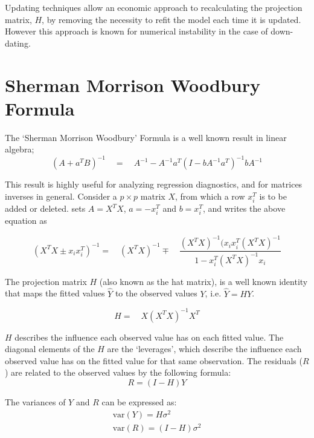 \documentclass[12pt, a4paper]{article}
\begin{document}
Updating techniques allow an economic approach to recalculating
the projection matrix, $H$, by removing the necessity to refit the
model each time it is updated. However this approach is known for
numerical instability in the case of down-dating.

\section{Sherman Morrison Woodbury Formula} %

The `Sherman Morrison Woodbury' Formula is a well known result in
linear algebra;
\begin{equation}
(A+a^{T}B)^{-1} \quad = \quad A^{-1}-
A^{-1}a^{T}(I-bA^{-1}a^{T})^{-1}bA^{-1}
\end{equation}

This result is highly useful for analyzing regression diagnostics,
and for matrices inverses in general. Consider a $p \times p$
matrix $X$, from which a row $x_{i}^{T}$ is to be added or
deleted. \citet{CookWeisberg} sets $A = X^{T}X$, $a=-x_{i}^{T}$
and $b=x_{i}^{T}$, and writes the above equation as

\begin{equation}
(X^{T}X \pm x_{i}x_{i}^{T})^{-1} = \quad(X^{T}X )^{-1} \mp \quad
\frac{(X^{T}X)^{-1}(x_{i}x_{i}^{T}(X^{T}X)^{-1}}{1-x_{i}^{T}(X^{T}X)^{-1}x_{i}}
\end{equation}

The projection matrix $H$ (also known as the hat matrix), is a
well known identity that maps the fitted values $\hat{Y}$ to the
observed values $Y$, i.e. $\hat{Y} = HY$.

\begin{equation}
H =\quad X(X^{T}X)^{-1}X^{T}
\end{equation}

$H$ describes the influence each observed value has on each fitted value. The diagonal elements of the $H$ are the `leverages', which describe the influence each observed value has on the fitted value for that same observation. The residuals ($R$) are related to the observed values by the following formula:
\begin{equation}
R = (I-H)Y
\end{equation}

The variances of $Y$ and $R$ can be expressed as:
\begin{eqnarray}
\mbox{var}(Y) = H\sigma^{2} \nonumber\\
\mbox{var}(R) = (I-H)\sigma^{2}
\end{eqnarray}
\end{document}
